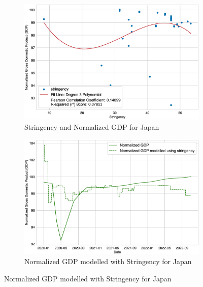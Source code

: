 \documentclass[tikz,fleqn,12pt]{wlscirep}
\begin{document}
\begin{figure}[H]
  \begin{subfigure}[t]{0.48\textwidth}
    \centering
    \includegraphics[width=\linewidth]{images/stringency_vs_gdp_JPN.eps}
    \caption{Stringency and Normalized GDP for Japan}
  \end{subfigure}
  \label{fig:stringency_vs_gdp_JPN}
  \hfill
  \begin{subfigure}[t]{0.48\textwidth}
    \centering
    \includegraphics[width=\linewidth]{images/gdp_modelled_with_stringency_JPN.eps}
    \caption{Normalized GDP modelled with Stringency for Japan}
  \end{subfigure}
  \label{fig:gdp_modelled_with_stringency_JPN}


\end{figure}
\end{document}
